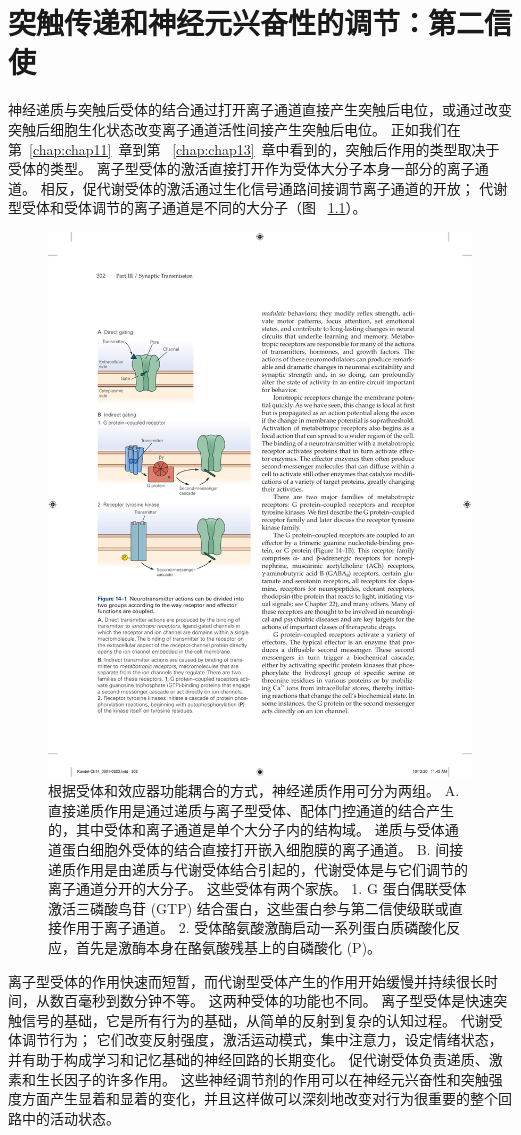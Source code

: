 \chapter{突触传递和神经元兴奋性的调节：第二信使} \label{chap:chap14}

神经递质与突触后受体的结合通过打开离子通道直接产生突触后电位，或通过改变突触后细胞生化状态改变离子通道活性间接产生突触后电位。
正如我们在第~\ref{chap:chap11}~章到第 ~\ref{chap:chap13}~章中看到的，突触后作用的类型取决于受体的类型。
离子型受体的激活直接打开作为受体大分子本身一部分的离子通道。
相反，促代谢受体的激活通过生化信号通路间接调节离子通道的开放；
代谢型受体和受体调节的离子通道是不同的大分子（图 ~\ref{fig:14_1}）。


\begin{figure}[htbp]
	\centering
	\includegraphics[width=0.5\linewidth]{chap14/fig_14_1}
	\caption{根据受体和效应器功能耦合的方式，神经递质作用可分为两组。 A. 直接递质作用是通过递质与离子型受体、配体门控通道的结合产生的，其中受体和离子通道是单个大分子内的结构域。 递质与受体通道蛋白细胞外受体的结合直接打开嵌入细胞膜的离子通道。 B. 间接递质作用是由递质与代谢受体结合引起的，代谢受体是与它们调节的离子通道分开的大分子。 这些受体有两个家族。 1. G 蛋白偶联受体激活三磷酸鸟苷 (GTP) 结合蛋白，这些蛋白参与第二信使级联或直接作用于离子通道。 2. 受体酪氨酸激酶启动一系列蛋白质磷酸化反应，首先是激酶本身在酪氨酸残基上的自磷酸化 (P)。}
	\label{fig:14_1}
\end{figure}


离子型受体的作用快速而短暂，而代谢型受体产生的作用开始缓慢并持续很长时间，从数百毫秒到数分钟不等。
这两种受体的功能也不同。
离子型受体是快速突触信号的基础，它是所有行为的基础，从简单的反射到复杂的认知过程。
代谢受体调节行为；
它们改变反射强度，激活运动模式，集中注意力，设定情绪状态，并有助于构成学习和记忆基础的神经回路的长期变化。
促代谢受体负责递质、激素和生长因子的许多作用。
这些神经调节剂的作用可以在神经元兴奋性和突触强度方面产生显着和显着的变化，并且这样做可以深刻地改变对行为很重要的整个回路中的活动状态。


